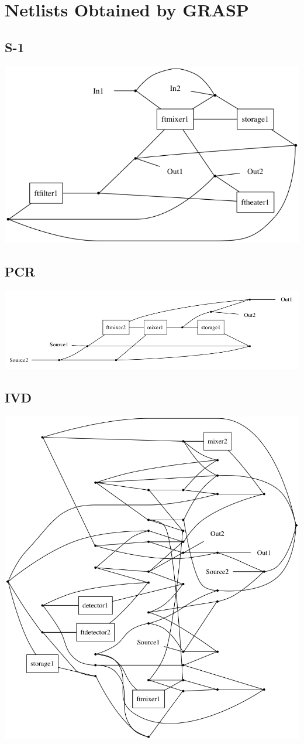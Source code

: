 \section{Netlists Obtained by GRASP}
\subsection{S-1}
\includegraphics[scale=0.35]{figures/ft-grasp-arch-mes-example-final.png}

\subsection{PCR}
\includegraphics[scale=0.35]{figures/ft-grasp-archPCR1s-final.png}

\subsection{IVD}
\includegraphics[scale=0.35]{figures/ft-grasp-archIVD1s-final.png}